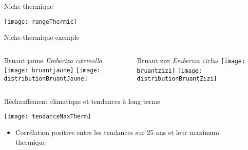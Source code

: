 \documentclass[10pt]{beamer}
\begin{document}
\begin{frame}{Niche thermique}
  \begin{center}
   \texttt{[image: rangeThermic]}
  \end{center}

\end{frame}

\begin{frame}{Niche thermique exemple}
  \begin{columns}[c]
    \begin{column}[c]{0.5\textwidth}
      \begin{center}
       Bruant jaune \textit{Emberiza citrinella}
        \vspace{10pt}
        \texttt{[image: bruantjaune]}
          \vspace{5pt}
          \texttt{[image: distributionBruantJaune]}   
      \end{center}
    \end{column}
    \begin{column}[c]{0.5\textwidth}
   
     \begin{center}
       Bruant zizi \textit{Emberiza cirlus}
        \vspace{10pt}
        \texttt{[image: bruantzizi]}
          \vspace{5pt}
          \texttt{[image: distributionBruantZizi]}   
      \end{center}
    
    
    \end{column}
  \end{columns}
\end{frame}

\begin{frame}{Réchauffement climatique et tendances à long terme}
  \begin{center}
   \texttt{[image: tendanceMaxTherm]}\\
  \vspace{10pt}
   \begin{itemize}
    \item <2> Corrélation positive entre les tendances sur 25 ans et leur maximum thermique
   \end{itemize}

  \end{center}

\end{frame}
\end{document}
